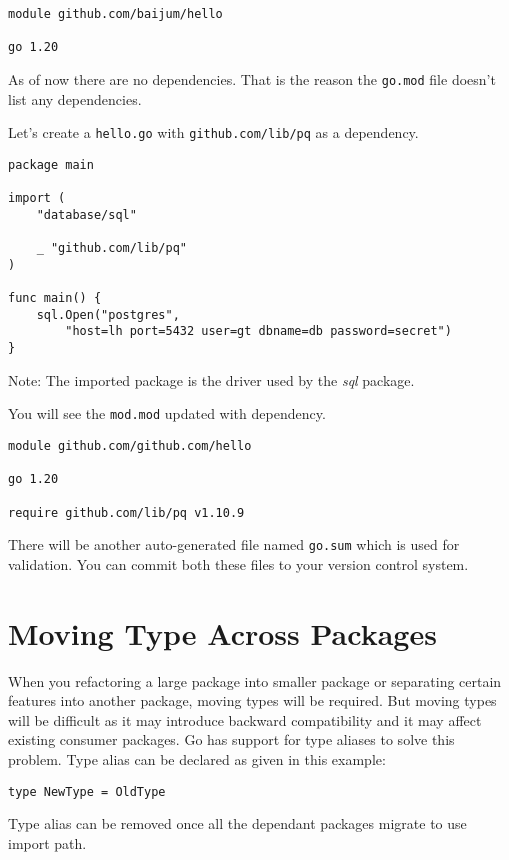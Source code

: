 \begin{lstlisting}[numbers=none]
module github.com/baijum/hello

go 1.20
\end{lstlisting}

As of now there are no dependencies.  That is the reason
the \texttt{go.mod} file doesn't list any dependencies.

Let's create a \texttt{hello.go} with \texttt{github.com/lib/pq}
as a dependency.

\begin{lstlisting}[numbers=none]
package main

import (
	"database/sql"

	_ "github.com/lib/pq"
)

func main() {
	sql.Open("postgres",
		"host=lh port=5432 user=gt dbname=db password=secret")
}
\end{lstlisting}

Note: The imported package is the driver used by the \textit{sql} package.

You will see the \texttt{mod.mod} updated with dependency.

\begin{lstlisting}[numbers=none]
module github.com/github.com/hello

go 1.20

require github.com/lib/pq v1.10.9
\end{lstlisting}

There will be another auto-generated file named \texttt{go.sum} which
is used for validation.  You can commit both these files to your
version control system.

\section{Moving Type Across Packages}

When you refactoring a large package into smaller package or
separating certain features into another package, moving types will be
required.  But moving types will be difficult as it may introduce
backward compatibility and it may affect existing consumer packages.
Go has support for type aliases to solve this problem.  Type
alias can be declared as given in this example:

\begin{lstlisting}[numbers=none]
type NewType = OldType
\end{lstlisting}

Type alias can be removed once all the dependant packages migrate to
use import path.

